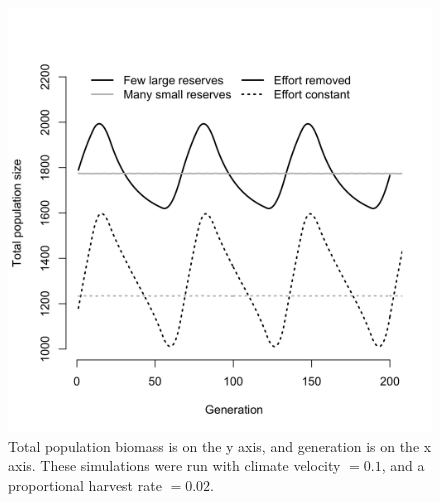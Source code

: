 \documentclass[12pt,english]{article}
\begin{document}
\begin{figure}[h]
\centering
\includegraphics[width=.75\textwidth]{../../../plots/compare_flucts.png}
\caption{\label{fluctuations} Total population biomass is on the y axis, and generation is on the x axis. These simulations were run with climate velocity $ = 0.1$, and a proportional harvest rate $= 0.02$. }
\end{figure}
 
\end{document}
